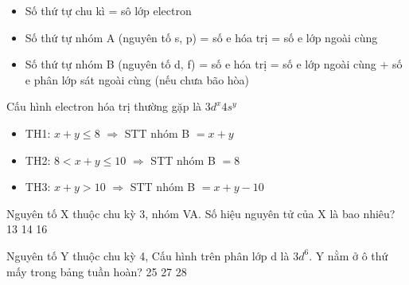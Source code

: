 \begin{pp}
	\begin{itemize}
		\item Số thứ tự chu kì = sô lớp electron
		\item Số thứ tự nhóm A (nguyên tố s, p)  = số e hóa trị = số e lớp ngoài cùng
		\item Số thứ tự nhóm B (nguyên tố d, f)  = số e hóa trị = số e lớp ngoài cùng + số e phân lớp sát ngoài cùng (nếu chưa bão hòa)
	\end{itemize}
	Cấu hình electron hóa trị thường gặp là $3d^x4s^y$
	\begin{itemize}
		\item TH1: $x+y \leq 8 $ $\Rightarrow $ STT nhóm B $=x+y$
		\item TH2: $ 8 <x+y \leq 10 $ $\Rightarrow $ STT nhóm B $=8$
		\item TH3: $x+y > 10 $ $\Rightarrow $ STT nhóm B $=x+y-10$
	\end{itemize}
\end{pp}
\begin{vdex}
	Nguyên tố X thuộc chu kỳ 3, nhóm VA. Số hiệu nguyên tử của X là bao nhiêu?
	\choice
	{13}
	{14}
	{}
	{16}
\end{vdex}
\begin{vdex}
	Nguyên tố Y thuộc chu kỳ 4, Cấu hình trên phân lớp d là $3d^6$. Y nằm ở ô thứ mấy trong bảng tuần hoàn?
	\choice
	{25}
	{}
	{27}
	{28}
\end{vdex}

